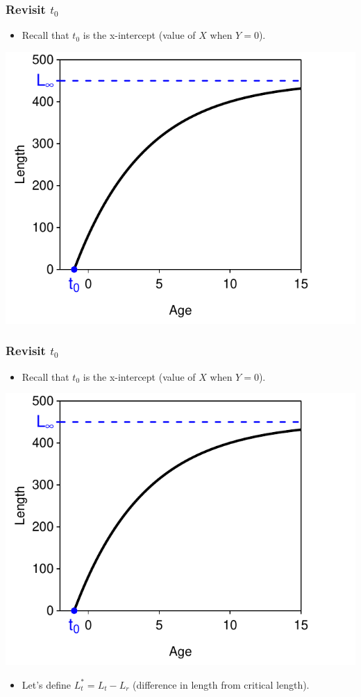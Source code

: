 \documentclass[xcolor=dvipsnames]{beamer}\usepackage[]{graphicx}\usepackage[]{color}
\newenvironment{knitrout}{}{} %
\begin{document}
\begin{frame}[fragile, t]
\frametitle{Revisit $t_{0}$}
  \vspace{-6pt}
  \begin{itemize}
    \item Recall that $t_{0}$ is the x-intercept (value of $X$ when $Y=0$).
  \end{itemize}

\begin{knitrout}\footnotesize
{}\color{fgcolor}

{\centering \includegraphics[width=.5\linewidth]{Figs/redefine1-1} 

}



\end{knitrout}
\end{frame}


\begin{frame}[fragile, t]
\frametitle{Revisit $t_{0}$}
  \vspace{-6pt}
  \begin{itemize}
    \item Recall that $t_{0}$ is the x-intercept (value of $X$ when $Y=0$).
  \end{itemize}
\begin{knitrout}\footnotesize
{}\color{fgcolor}

{\centering \includegraphics[width=.5\linewidth]{Figs/redefine2-1} 

}



\end{knitrout}
  \begin{itemize}
    \item Let's define $L^{*}_{t}=L_{t}-L_{r}$ (difference in length from critical length).
  \end{itemize}
\end{frame}
\end{document}
